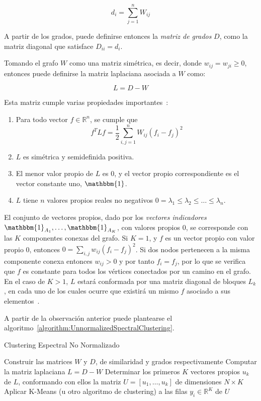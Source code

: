 \begin{equation*}
    d_i = \sum_{j=1}^{n}{W_{ij}}
\end{equation*}

A partir de los grados, puede definirse entonces la \textit{matriz de grados} $D$, como la matriz diagonal que satisface $D_{ii}=d_i$.

Tomando el grafo $W$ como una matriz simétrica, es decir, donde $w_{ij}=w_{ji}\geq 0$, entonces puede definirse la matriz laplaciana asociada a $W$ como:

\begin{equation}
    \label{eq:laplacian-graph}
    L = D - W
\end{equation}

Esta matriz cumple varias propiedades importantes~\cite{Luxburg07}:

\begin{enumerate}
    \item Para todo vector $f\in \mathbb{R}^n$, se cumple que
    \[
        f^T Lf = \frac{1}{2}\sum_{i,j=1}^{n}{W_{ij}(f_i - f_j)^2}
    \]
    \item $L$ es simétrica y semidefinida positiva.
    \item El menor valor propio de $L$ es 0, y el vector propio correspondiente es el vector constante uno, $\mathbbm{1}$.
    \item $L$ tiene $n$ valores propios reales no negativos $0=\lambda_1 \leq \lambda_2 \leq \dots \leq \lambda_n$.
\end{enumerate}

El conjunto de vectores propios, dado por los \textit{vectores indicadores} $\mathbbm{1}_{A_1}, \dots, \mathbbm{1}_{A_K}$, con valores propios 0, se corresponde con las $K$ componentes conexas del grafo.
Si $K=1$, y $f$ es un vector propio con valor propio 0, entonces $0=\sum_{i,j}{w_{ij}(f_i - f_j)^2}$.
Si dos nodos pertenecen a la misma componente conexa entonces $w_{ij}>0$ y por tanto $f_i = f_j$, por lo que se verifica que $f$ es constante para todos los vértices conectados por un camino en el grafo.
En el caso de $K>1$, $L$ estará conformada por una matriz diagonal de bloques $L_k$, en cada uno de los cuales ocurre que existirá un mismo $f$ asociado a sus elementos~\cite{Luxburg07,Murphy12}.

A partir de la observación anterior puede plantearse el algoritmo~\ref{algorithm:UnnormalizedSpectralClustering}.

\begin{algorithm}
    \caption{Clustering Espectral No Normalizado}
    \label{algorithm:UnnormalizedSpectralClustering}
    Construir las matrices $W$ y $D$, de similaridad y grados respectivamente\;
    Computar la matriz laplaciana $L = D-W$\;
    Determinar los primeros $K$ vectores propios $u_k$ de $L$, conformando con ellos la matriz $U = [u_1,\dots,u_k]$ de dimensiones $N\times K$\;
    Aplicar K-Means (u otro algoritmo de clustering) a las filas $y_{i}\in \mathbb{R}^K$ de $U$\;
\end{algorithm}

